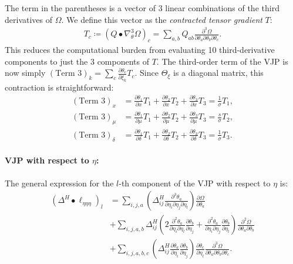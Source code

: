 \documentclass{article}
\begin{document}
%
The term in the parentheses is a vector of 3 linear combinations of the third derivatives of $\Omega$.
We define this vector as the \textit{contracted tensor gradient} $T$:
%
\begin{align}
  T_c \coloneqq (Q \bullet \nabla_\theta^3 \Omega)_c = \sum_{a,b} Q_{ab} \frac{\partial^3 \Omega}{\partial \theta_a \partial \theta_b \partial \theta_c}.
\end{align}
%
This reduces the computational burden from evaluating 10 third-derivative components to just the 3 components of $T$.
The third-order term of the VJP is now simply $(\text{Term 3})_k = \sum_c \frac{\partial \theta_c}{\partial \xi_k} T_c$.
Since $\Theta_\xi$ is a diagonal matrix, this contraction is straightforward:
%
\begin{align}
  (\text{Term 3})_x      & = \frac{\partial \theta_1}{\partial x} T_1 + \frac{\partial \theta_2}{\partial x} T_2 + \frac{\partial \theta_3}{\partial x} T_3 = \frac{1}{\sigma} T_1,                \\
  (\text{Term 3})_\mu    & = \frac{\partial \theta_1}{\partial \mu} T_1 + \frac{\partial \theta_2}{\partial \mu} T_2 + \frac{\partial \theta_3}{\partial \mu} T_3 = \frac{s}{\sigma} T_2,          \\
  (\text{Term 3})_\delta & = \frac{\partial \theta_1}{\partial \delta} T_1 + \frac{\partial \theta_2}{\partial \delta} T_2 + \frac{\partial \theta_3}{\partial \delta} T_3 = \frac{1}{\sigma} T_3.
\end{align}

\paragraph{VJP with respect to $\eta$:}

The general expression for the $l$-th component of the VJP with respect to $\eta$ is:
%
\begin{align}
  (\Delta^H \bullet \ell_{\eta\eta\eta})_l & = \sum_{i,j,a} \left( \Delta^H_{ij} \frac{\partial^3 \theta_a}{\partial \eta_i \partial \eta_j \partial \eta_l} \right) \frac{\partial \Omega}{\partial \theta_a} \nonumber                                                                                                                                                                          \\
                                           & + \sum_{i,j,a,b} \Delta^H_{ij} \left( 2 \frac{\partial^2 \theta_a}{\partial \eta_i \partial \eta_l} \frac{\partial \theta_b}{\partial \eta_j} + \frac{\partial^2 \theta_a}{\partial \eta_i \partial \eta_j} \frac{\partial \theta_b}{\partial \eta_l} \right) \frac{\partial^2 \Omega}{\partial \theta_a \partial \theta_b} \nonumber \\
                                           & + \sum_{i,j,a,b,c} \left( \Delta^H_{ij} \frac{\partial \theta_a}{\partial \eta_i} \frac{\partial \theta_b}{\partial \eta_j} \right) \frac{\partial \theta_c}{\partial \eta_l} \frac{\partial^3 \Omega}{\partial \theta_a \partial \theta_b \partial \theta_c}.
\end{align}
\end{document}
